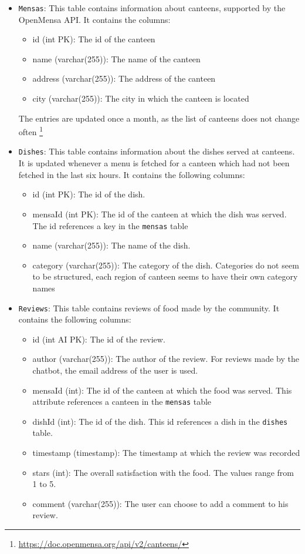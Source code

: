 \begin{itemize}
    \item \texttt{Mensas}: This table contains information about canteens, supported by the OpenMensa API. It contains the columns:
    \begin{itemize}
        \item id (int PK): The id of the canteen
        \item name (varchar(255)): The name of the canteen
        \item address (varchar(255)): The address of the canteen
        \item city (varchar(255)): The city in which the canteen is located 
    \end{itemize}
    The entries are updated once a month, as the list of canteens does not change often \footnote{\href{ OpenMensa API specification}{https://doc.openmensa.org/api/v2/canteens/}}
    \item \texttt{Dishes}: This table contains information about the dishes served at canteens. It is updated whenever a menu is fetched for a canteen which had not been fetched in the last six hours. It contains the following columns:
    \begin{itemize}
        \item id (int PK): The id of the dish. 
        \item mensaId (int PK): The id of the canteen at which the dish was served. The id references a key in the \texttt{mensas} table
        \item name (varchar(255)): The name of the dish.
        \item category (varchar(255)): The category of the dish. Categories do not seem to be structured, each region of canteen seems to have their own category names
    \end{itemize}
    \item \texttt{Reviews}: This table contains reviews of food made by the community. It contains the following columns:
    \begin{itemize}
        \item id (int AI PK): The id of the review.
        \item author (varchar(255)): The  author of the review. For reviews made by the chatbot, the email address of the user is used.
        \item mensaId (int): The id of the canteen at which the food was served. This attribute references a canteen in the \texttt{mensas} table
        \item dishId (int): The id of the dish. This id references a dish in the \texttt{dishes} table.
        \item timestamp (timestamp): The timestamp at which the review was recorded
        \item stars (int): The overall satisfaction with the food. The values range from 1 to 5.
        \item comment (varchar(255)): The user can choose to add a comment to his review.
    \end{itemize}
\end{itemize}
